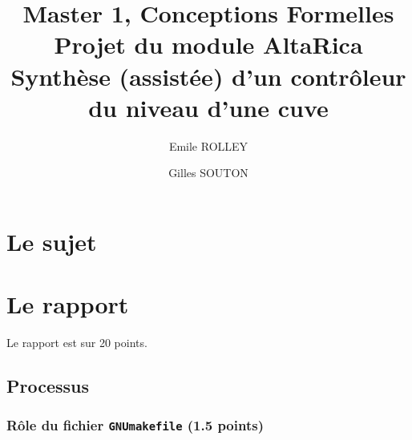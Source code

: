\documentclass[a4paper]{book}
\newcommand{\altarica}{{\sc AltaRica}}
\begin{document}
\title{Master 1, Conceptions Formelles\\
Projet du module \altarica\\
Synthèse (assistée) d'un contrôleur du niveau d'une cuve}

\date{}

\author{Emile ROLLEY \and Gilles SOUTON}

\maketitle

\chapter{Le sujet}


\chapter{Le rapport}
Le rapport est sur 20 points.

\section{Processus}

\subsection{Rôle du fichier {\tt GNUmakefile} (1.5 points)}
\end{document}

